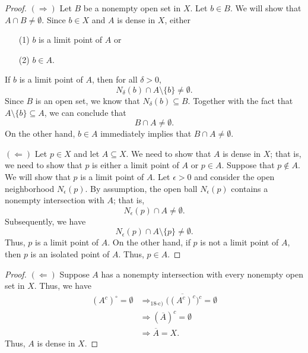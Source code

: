 \documentclass[a4paper]{article}
\begin{document}
\begin{enumerate}
            \begin{proof}
            \( (\Longrightarrow) \) Let \( B  \) be a nonempty open set in \( X  \). Let \( b \in B  \). We will show that \( A \cap B \neq \emptyset \). Since \( b \in X  \) and \( A  \) is dense in \( X  \), either 
            \begin{enumerate}
                \item[(1)] \( b   \) is a limit point of \( A  \) or
                \item[(2)] \( b \in A  \).
            \end{enumerate}
            If \( b  \) is a limit point of \( A  \), then for all \( \delta > 0  \), 
            \[  {N}_{\delta}(b) \cap A \setminus  \{ b \} \neq \emptyset.  \]
            Since \( B \) is an open set, we know that \( {N}_{\delta}(b) \subseteq B \). Together with the fact that \( A \setminus  \{ b \} \subseteq  A  \), we can conclude that 
            \[  B \cap A \neq \emptyset. \]
            On the other hand, \( b \in A  \) immediately implies that \( B \cap A \neq \emptyset \).

            \( (\Longleftarrow) \) Let \( p \in X  \) and let \( A \subseteq X  \). We need to show that \( A  \) is dense in \( X  \); that is, we need to show that \( p  \) is either a limit point of \( A  \) or \( p \in A  \). Suppose that \( p \notin A  \). We will show that \( p  \) is a limit point of \( A  \). Let \( \epsilon > 0 \) and consider the open neighborhood \( {N}_{\epsilon}(p) \). By assumption, the open ball \( {N}_{\epsilon}(p) \) contains a nonempty intersection with \( A  \); that is,  
            \[  {N}_{\epsilon}(p) \cap A \neq \emptyset. \]
            Subsequently, we have
            \[  {N}_{\epsilon}(p) \cap A \setminus  \{ p\} \neq \emptyset.  \]
            Thus, \( p  \) is a limit point of \( A  \). On the other hand, if \( p  \) is not a limit point of \( A  \), then \( p \) is an isolated point of \( A  \). Thus, \( p \in A  \). 
        \end{proof}
        \begin{proof}
        \( (\Longleftarrow) \) Suppose \( A  \) has a nonempty intersection with every nonempty open set in \( X  \). Thus, we have     
        \begin{align*}
            (A^{c})^{\circ} = \emptyset &\Longrightarrow_{\text{18-c)}} \Big(  \overline{(A^{c})^{c}} \Big)^{c} = \emptyset \\
                                        &\Longrightarrow  (\overline{A})^{c} = \emptyset \\
                                        &\Longrightarrow \overline{A} = X.
        \end{align*}
        Thus, \( A  \) is dense in \( X  \).


\end{proof}
\end{enumerate}
\end{document}
